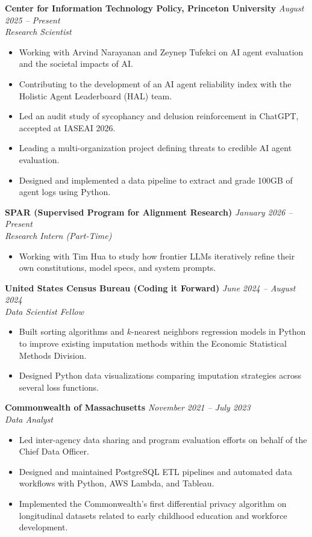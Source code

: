 \documentclass[11pt]{article}
\begin{document}
\textbf{Center for Information Technology Policy, Princeton University} \hfill \textit{August 2025 -- Present}\\
\textit{Research Scientist}
\begin{itemize}
    \item Working with Arvind Narayanan and Zeynep Tufekci on AI agent evaluation and the societal impacts of AI.
    \item Contributing to the development of an AI agent reliability index with the Holistic Agent Leaderboard (HAL) team.
    \item Led an audit study of sycophancy and delusion reinforcement in ChatGPT, accepted at IASEAI 2026.
    \item Leading a multi-organization project defining threats to credible AI agent evaluation.
    \item Designed and implemented a data pipeline to extract and grade 100GB of agent logs using Python.
\end{itemize}

\vspace{1em}
\textbf{SPAR (Supervised Program for Alignment Research)} \hfill \textit{January 2026 -- Present}\\
\textit{Research Intern (Part-Time)}
\begin{itemize}
    \item Working with Tim Hua to study how frontier LLMs iteratively refine their own constitutions, model specs, and system prompts.
\end{itemize}

\vspace{1em}
\textbf{United States Census Bureau (Coding it Forward)} \hfill \textit{June 2024 -- August 2024}\\
\textit{Data Scientist Fellow}
\begin{itemize}
    \item Built sorting algorithms and $k$-nearest neighbors regression models in Python to improve existing imputation methods within the Economic Statistical Methods Division.
    \item Designed Python data visualizations comparing imputation strategies across several loss functions.
\end{itemize}

\vspace{1em}
\textbf{Commonwealth of Massachusetts} \hfill \textit{November 2021 -- July 2023}\\
\textit{Data Analyst}
\begin{itemize}
    \item Led inter-agency data sharing and program evaluation efforts on behalf of the Chief Data Officer.
    \item Designed and maintained PostgreSQL ETL pipelines and automated data workflows with Python, AWS Lambda, and Tableau.
    \item Implemented the Commonwealth's first differential privacy algorithm on longitudinal datasets related to early childhood education and workforce development.
\end{itemize}
\end{document}
